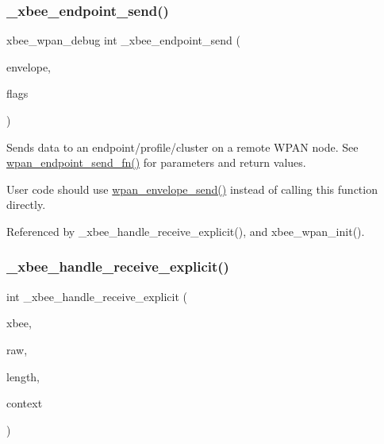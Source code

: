 \subsubsection{\texorpdfstring{\+\_\+xbee\+\_\+endpoint\+\_\+send()}{\_xbee\_endpoint\_send()}}
{\footnotesize\ttfamily xbee\+\_\+wpan\+\_\+debug int \+\_\+xbee\+\_\+endpoint\+\_\+send (\begin{DoxyParamCaption}\item[{const \hyperlink{structwpan__envelope__t}{wpan\+\_\+envelope\+\_\+t} \hyperlink{group__hal_gaef060b3456fdcc093a7210a762d5f2ed}{F\+AR} $\ast$}]{envelope,  }\item[{\hyperlink{group__hal__dos_ga5a8b2dc9e45a9ee81a94ef304fb62505}{uint16\+\_\+t}}]{flags }\end{DoxyParamCaption})}

Sends data to an endpoint/profile/cluster on a remote W\+P\+AN node. See \hyperlink{group__wpan__aps_ga505477d0257efe527747c6d1f561cd6c}{wpan\+\_\+endpoint\+\_\+send\+\_\+fn()} for parameters and return values.

User code should use \hyperlink{group__wpan__aps_ga06f1e9e86b74ef807ded44b79b13e283}{wpan\+\_\+envelope\+\_\+send()} instead of calling this function directly. 

Referenced by \+\_\+xbee\+\_\+handle\+\_\+receive\+\_\+explicit(), and xbee\+\_\+wpan\+\_\+init().

\mbox{\label{group__xbee__wpan_ga8cb1973677412a2c5627a77009a8f283}} 
\subsubsection{\texorpdfstring{\+\_\+xbee\+\_\+handle\+\_\+receive\+\_\+explicit()}{\_xbee\_handle\_receive\_explicit()}}
{\footnotesize\ttfamily int \+\_\+xbee\+\_\+handle\+\_\+receive\+\_\+explicit (\begin{DoxyParamCaption}\item[{\hyperlink{structxbee__dev__t}{xbee\+\_\+dev\+\_\+t} $\ast$}]{xbee,  }\item[{const void \hyperlink{group__hal_gaef060b3456fdcc093a7210a762d5f2ed}{F\+AR} $\ast$}]{raw,  }\item[{\hyperlink{group__hal__dos_ga5a8b2dc9e45a9ee81a94ef304fb62505}{uint16\+\_\+t}}]{length,  }\item[{void \hyperlink{group__hal_gaef060b3456fdcc093a7210a762d5f2ed}{F\+AR} $\ast$}]{context }\end{DoxyParamCaption})}



